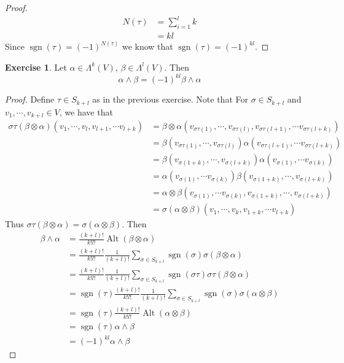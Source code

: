\documentclass{book}
\theoremstyle{definition}
\newtheorem{ex}[definition]{Exercise}
\newcommand{\al}{\alpha}
\newcommand{\be}{\beta}
\newcommand{\sig}{\sigma}
\newcommand{\Lam}{\Lambda}
\DeclareMathOperator{\sgn}{sgn}
\DeclareMathOperator{\Alt}{Alt}
\DeclareMathOperator*{\0}{\mbf{0}}
\DeclareMathOperator*{\1}{\mbf{1}}
\begin{document}
	\begin{proof}
		\begin{align*}
			N(\tau) 
			&= \sum_{i = 1}^l k \\
			&= kl
		\end{align*}
		Since $\sgn (\tau) = (-1)^{N(\tau)}$ we know that  $\sgn(\tau) = (-1)^{kl}$.
	\end{proof}

	
	\begin{ex}
		Let $\al \in \Lam^k(V)$, $\be \in \Lam^l(V)$. Then $$\al \wedge \be = (-1)^{kl}\be \wedge \al$$
	\end{ex}

	\begin{proof}
		Define $\tau \in S_{k+l}$ as in the previous exercise. Note that For $\sig \in S_{k+l}$ and $v_1, \cdots, v_{k +l} \in V$, we have that 
		\begin{align*}
			\sig \tau (\be \otimes \al)(v_1, \cdots, v_l, v_{l+1}, \cdots v_{l+k}) 
			&= \be \otimes \al(v_{\sig \tau(1)}, \cdots, v_{\sig \tau(l)}, v_{\sig \tau(l+1)}, \cdots v_{\sig \tau(l+k)}) \\
			&= \be(v_{\sig \tau(1)}, \cdots, v_{\sig \tau(l)}) \al(v_{\sig \tau(l+1)}, \cdots v_{\sig \tau(l+k)}) \\
			&= \be(v_{\sig (1+k)}, \cdots, v_{\sig (l+k)}) \al(v_{\sig (1)}, \cdots v_{\sig (k)})\\ 
			&= \al(v_{\sig (1)}, \cdots v_{\sig (k)}) \be(v_{\sig (1+k)}, \cdots, v_{\sig (l+k)}) \\
			&= \al \otimes \be (v_{\sig (1)}, \cdots v_{\sig (k)}, v_{\sig (1+k)}, \cdots, v_{\sig (l+k)}) \\
			&= \sig (\al \otimes \be) (v_1, \cdots, v_k, v_{1+k}, \cdots v_{l+k})
		\end{align*}
		Thus $\sig \tau (\be \otimes \al) = \sig (\al \otimes \be)$. Then 
		\begin{align*}
			\be \wedge \al
			&= \frac{(k+l)!}{k!l!}\Alt(\be \otimes \al) \\
			&=  \frac{(k+l)!}{k!l!} \frac{1}{(k+l)!} \sum_{\sig \in S_{k+l}} \sgn(\sig) \sig (\be \otimes \al) \\
			&= \frac{(k+l)!}{k!l!} \frac{1}{(k+l)!} \sum_{\sig \in S_{k+l}} \sgn(\sig \tau) \sig \tau (\be \otimes \al) \\
			&= \sgn(\tau)\frac{(k+l)!}{k!l!} \frac{1}{(k+l)!} \sum_{\sig \in S_{k+l}} \sgn(\sig) \sig (\al \otimes \be) \\
			&= \sgn(\tau)\frac{(k+l)!}{k!l!}  \Alt(\al \otimes \be) \\
			&= \sgn(\tau) \al \wedge \be \\
			&= (-1)^{kl} \al \wedge \be
		\end{align*}
	 
	\end{proof}
\end{document}
